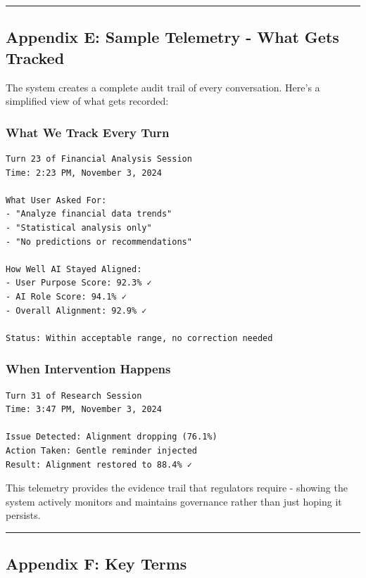 \begin{center}\rule{0.5\linewidth}{0.5pt}\end{center}

\subsection{Appendix E: Sample Telemetry - What Gets
Tracked}\label{appendix-e-sample-telemetry---what-gets-tracked}

The system creates a complete audit trail of every conversation. Here's
a simplified view of what gets recorded:

\subsubsection{What We Track Every Turn}\label{what-we-track-every-turn}

\begin{verbatim}
Turn 23 of Financial Analysis Session
Time: 2:23 PM, November 3, 2024

What User Asked For:
- "Analyze financial data trends"
- "Statistical analysis only"  
- "No predictions or recommendations"

How Well AI Stayed Aligned:
- User Purpose Score: 92.3% ✓
- AI Role Score: 94.1% ✓
- Overall Alignment: 92.9% ✓

Status: Within acceptable range, no correction needed
\end{verbatim}

\subsubsection{When Intervention
Happens}\label{when-intervention-happens}

\begin{verbatim}
Turn 31 of Research Session
Time: 3:47 PM, November 3, 2024

Issue Detected: Alignment dropping (76.1%)
Action Taken: Gentle reminder injected
Result: Alignment restored to 88.4% ✓
\end{verbatim}

This telemetry provides the evidence trail that regulators require -
showing the system actively monitors and maintains governance rather
than just hoping it persists.

\begin{center}\rule{0.5\linewidth}{0.5pt}\end{center}

\subsection{Appendix F: Key Terms}\label{appendix-f-key-terms}

